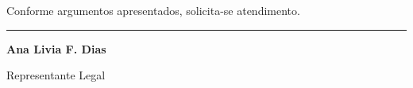 \documentclass[11pt,a4paper]{article}
\begin{document}
Conforme argumentos apresentados, solicita-se atendimento.

\vspace{2cm}
\begin{center}
\noindent\rule{6cm}{0.4pt}

\textbf{Ana Livia F. Dias}

{\small Representante Legal}
\end{center}
\end{document}

